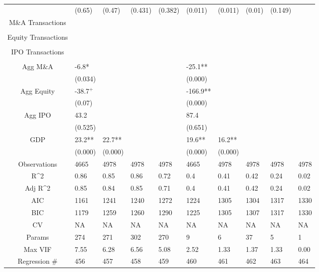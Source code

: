 \documentclass{article}
\begin{document}
\begin{table}[H]
\begin{tabular}{|clllllllll|}
   & (0.65) & (0.47) & (0.431) & (0.382) & (0.011) & (0.011) & (0.01) & (0.149) &  \\ 
  M\&A Transactions &  &  &  &  &  &  &  &  &  \\ 
   &  &  &  &  &  &  &  &  &  \\ 
  Equity Transactions &  &  &  &  &  &  &  &  &  \\ 
   &  &  &  &  &  &  &  &  &  \\ 
  IPO Transactions &  &  &  &  &  &  &  &  &  \\ 
   &  &  &  &  &  &  &  &  &  \\ 
  Agg M\&A & -6.8* &  &  &  & -25.1** &  &  &  &  \\ 
   & (0.034) &  &  &  & (0.000) &  &  &  &  \\ 
  Agg Equity & -38.7$^{+}$ &  &  &  & -166.9** &  &  &  &  \\ 
   & (0.07) &  &  &  & (0.000) &  &  &  &  \\ 
  Agg IPO & 43.2 &  &  &  & 87.4 &  &  &  &  \\ 
   & (0.525) &  &  &  & (0.651) &  &  &  &  \\ 
  GDP & 23.2** & 22.7** &  &  & 19.6** & 16.2** &  &  &  \\ 
   & (0.000) & (0.000) &  &  & (0.000) & (0.000) &  &  &  \\ 
  \hline 
 Observations & 4665 & 4978 & 4978 & 4978 & 4665 & 4978 & 4978 & 4978 & 4978 \\ 
  R^2 & 0.86 & 0.85 & 0.86 & 0.72 & 0.4 & 0.41 & 0.42 & 0.24 & 0.02 \\ 
  Adj R^2 & 0.85 & 0.84 & 0.85 & 0.71 & 0.4 & 0.41 & 0.42 & 0.24 & 0.02 \\ 
  AIC & 1161 & 1241 & 1240 & 1272 & 1224 & 1305 & 1304 & 1317 & 1330 \\ 
  BIC & 1179 & 1259 & 1260 & 1290 & 1225 & 1305 & 1307 & 1317 & 1330 \\ 
  CV & NA & NA & NA & NA & NA & NA & NA & NA & NA \\ 
  Params & 274 & 271 & 302 & 270 & 9 & 6 & 37 & 5 & 1 \\ 
  Max VIF & 7.55 & 6.28 & 6.56 & 5.08 & 2.52 & 1.33 & 1.37 & 1.33 & 0.00 \\ 
  Regression \# & 456 & 457 & 458 & 459 & 460 & 461 & 462 & 463 & 464 \\ 
   \hline
\end{tabular}
 
\end{table}
\end{document}
